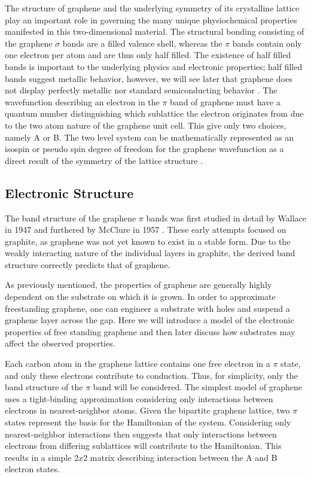 The structure of graphene and the underlying symmetry of its crystalline lattice play an important role in governing the many unique physiochemical properties manifested in this two-dimensional material. The structural bonding consisting of the graphene $\sigma$ bands are a filled valence shell, whereas the $\pi$ bands contain only one electron per atom and are thus only half filled. The existence of half filled bands is important to the underlying physics and electronic properties; half filled bands suggest metallic behavior, however, we will see later that graphene does not display perfectly metallic nor standard semiconducting behavior \cite{geim-elec, kitel}. The wavefunction describing an electron in the $\pi$ band of graphene must have a quantum number distinguishing which sublattice the electron originates from due to the two atom nature of the graphene unit cell. This give only two choices, namely A or B. The two level system can be mathematically represented as an isospin or pseudo spin degree of freedom for the graphene wavefunction as a direct result of the symmetry of the lattice structure \cite{Wolf}.

  \subsection{Electronic Structure}
  	The band structure of the graphene $\pi$ bands was first studied in detail by Wallace in 1947 and furthered by McClure in 1957 \cite{wallace, mcclure}. These early attempts focused on graphite, as graphene was not yet known to exist in a stable form. Due to the weakly interacting nature of the individual layers in graphite, the derived band structure correctly predicts that of graphene.

	As previously mentioned, the properties of graphene are generally highly dependent on the substrate on which it is grown. In order to approximate freestanding graphene, one can engineer a substrate with holes and suspend a graphene layer across the gap. Here we will introduce a model of the electronic properties of free standing graphene and then later discuss how substrates may affect the observed properties.

	Each carbon atom in the graphene lattice contains one free electron in a $\pi$ state, and only these electrons contribute to conduction. Thus, for simplicity, only the band structure of the $\pi$ band will be considered. The simplest model of graphene uses a tight-binding approximation considering only interactions between electrons in nearest-neighbor atoms. Given the bipartite graphene lattice, two $\pi$ states represent the basis for the Hamiltonian of the system. Considering only nearest-neighbor interactions then suggests that only interactions between electrons from differing sublattices will contribute to the Hamiltonian. This results in a simple $2x2$ matrix describing interaction between the A and B electron states.

